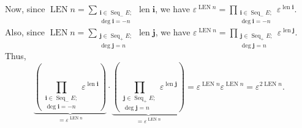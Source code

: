 \documentclass[etingof-lie.tex]{subfiles}
\begin{document}
Now, since $\operatorname*{LEN}n=\sum\limits_{\substack{\mathbf{i}%
\in\operatorname*{Seq}\nolimits_{-}E;\\\deg\mathbf{i}=-n}}\operatorname*{len}%
\mathbf{i}$, we have $\varepsilon^{\operatorname*{LEN}n}=\prod
\limits_{\substack{\mathbf{i}\in\operatorname*{Seq}\nolimits_{-}%
E;\\\deg\mathbf{i}=-n}}\varepsilon^{\operatorname*{len}\mathbf{i}}$. Also,
since $\operatorname*{LEN}n=\sum\limits_{\substack{\mathbf{j}\in
\operatorname*{Seq}\nolimits_{+}E;\\\deg\mathbf{j}=n}}\operatorname*{len}%
\mathbf{j}$, we have $\varepsilon^{\operatorname*{LEN}n}=\prod
\limits_{\substack{\mathbf{j}\in\operatorname*{Seq}\nolimits_{+}%
E;\\\deg\mathbf{j}=n}}\varepsilon^{\operatorname*{len}\mathbf{j}}$. Thus,%
\begin{equation}
\underbrace{\left(  \prod\limits_{\substack{\mathbf{i}\in\operatorname*{Seq}%
\nolimits_{-}E;\\\deg\mathbf{i}=-n}}\varepsilon^{\operatorname*{len}%
\mathbf{i}}\right)  }_{=\varepsilon^{\operatorname*{LEN}n}}\cdot
\underbrace{\left(  \prod\limits_{\substack{\mathbf{j}\in\operatorname*{Seq}%
\nolimits_{+}E;\\\deg\mathbf{j}=n}}\varepsilon^{\operatorname*{len}\mathbf{j}%
}\right)  }_{=\varepsilon^{\operatorname*{LEN}n}}=\varepsilon
^{\operatorname*{LEN}n}\varepsilon^{\operatorname*{LEN}n}=\varepsilon
^{2\operatorname*{LEN}n}. \label{pf.invformnondeg.polynomiality5.6}%
\end{equation}
\end{document}
